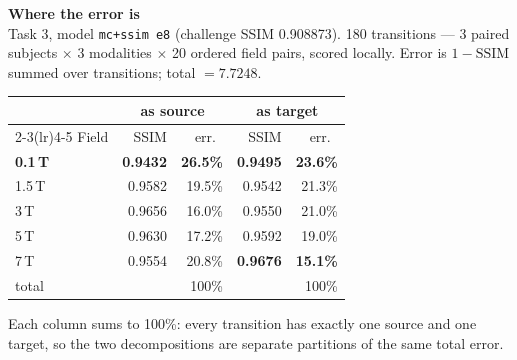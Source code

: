 \documentclass[10pt,a4paper]{article}
\newcommand{\bars}[5]{%
  \node[font=\small, anchor=east] at (-0.25,#1) {#2};
  \fill[src, opacity=#5] (0,#1+0.13) rectangle (#3*0.285,#1+0.40);
  \fill[tgt, opacity=#5] (0,#1-0.40) rectangle (#4*0.285,#1-0.13);
  \node[font=\scriptsize, text=src, anchor=west] at (#3*0.285+0.1,#1+0.265) {#3\%};
  \node[font=\scriptsize, text=tgt, anchor=west] at (#4*0.285+0.1,#1-0.265) {#4\%};}
\begin{document}
{\Large\bfseries Where the error is}\\[1mm]
{\small Task 3, model \texttt{mc+ssim e8} (challenge SSIM 0.908873). 180 transitions ---
3 paired subjects $\times$ 3 modalities $\times$ 20 ordered field pairs, scored locally.
Error is $1-\mathrm{SSIM}$ summed over transitions; total $=7.7248$.}\\[4mm]

\begin{minipage}[t]{0.46\textwidth}
\vspace{0pt}
\small
\begin{tabular}{lrrrr}
\toprule
& \multicolumn{2}{c}{as \textcolor{src}{source}} & \multicolumn{2}{c}{as \textcolor{tgt}{target}} \\
\cmidrule(lr){2-3}\cmidrule(lr){4-5}
Field & SSIM & err.\ & SSIM & err.\ \\
\midrule
\textbf{0.1\,T} & \textbf{0.9432} & \textbf{26.5\%} & \textbf{0.9495} & \textbf{23.6\%} \\
1.5\,T          & 0.9582 & 19.5\% & 0.9542 & 21.3\% \\
3\,T            & 0.9656 & 16.0\% & 0.9550 & 21.0\% \\
5\,T            & 0.9630 & 17.2\% & 0.9592 & 19.0\% \\
7\,T            & 0.9554 & 20.8\% & \textbf{0.9676} & \textbf{15.1\%} \\
\midrule
total           &        & 100\%  &        & 100\% \\
\bottomrule
\end{tabular}

\vspace{2mm}
{\footnotesize Each column sums to 100\%: every transition has exactly one source and one
target, so the two decompositions are separate partitions of the same total error.}
\end{minipage}\hfill
\begin{minipage}[t]{0.5\textwidth}
\vspace{0pt}
\end{minipage}
\end{document}
